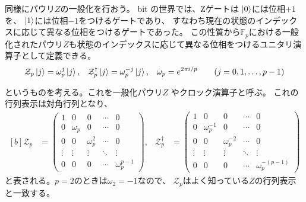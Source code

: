 \documentclass[../master.tex]{subfiles}
\begin{document}
同様にパウリ$Z$の一般化を行おう。
bit の世界では、Zゲートは $\ket{0}$には位相$+1$を、
$\ket{1}$には位相$-1$をつけるゲートであり、
すなわち現在の状態のインデックスに応じて異なる位相をつけるゲートであった。
この性質から$\mathbb{F}_p$における一般化されたパウリ$Z$も状態のインデックスに応じて異なる位相をつけるユニタリ演算子として定義できる。
\begin{equation}\begin{aligned}[b]
    \mathcal{Z}_p\ket{j} &= \omega_p^j \ket{j}, &
    \mathcal{Z}_p^\dagger \ket{j} &= \omega_p^{-j} \ket{j}, &
    \omega_p &= e^{2\pi i/p} \qquad (j=0,1,\ldots,p-1)\\
\end{aligned}\end{equation}
というものを考える。これを一般化パウリ$Z$ やクロック演算子と呼ぶ。
これの行列表示は対角行列となり、
\begin{equation}\begin{aligned}[b]
    \mathcal{Z}_p &= \begin{pmatrix}
        1 & 0 & 0 & \cdots & 0 \\
        0 & \omega_p & 0 & \cdots & 0 \\
        0 & 0 & \omega_p^2 & \cdots & 0 \\
        \vdots & \vdots & \vdots & \ddots & \vdots \\
        0 & 0 & 0 & \cdots & \omega_p^{p-1}
    \end{pmatrix}, &
    \mathcal{Z}_p^\dagger &= \begin{pmatrix}
        1 & 0 & 0 & \cdots & 0 \\
        0 & \omega_p^{-1} & 0 & \cdots & 0 \\
        0 & 0 & \omega_p^{-2} & \cdots & 0 \\
        \vdots & \vdots & \vdots & \ddots & \vdots \\
        0 & 0 & 0 & \cdots & \omega_p^{-(p-1)}
    \end{pmatrix}
\end{aligned}\end{equation}
と表される。$p=2$のときは$\omega_2=-1$なので、
$\mathcal{Z}_p$はよく知っている$Z$の行列表示と一致する。
\end{document}
